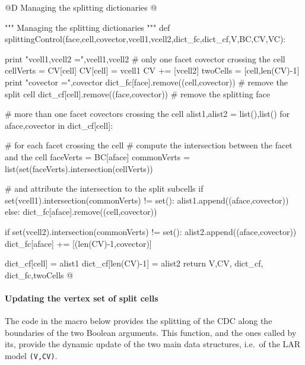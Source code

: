 \documentclass[11pt,oneside]{article}	%
\begin{document}
@D Managing the splitting dictionaries
@{""" Managing the splitting dictionaries """
def splittingControl(face,cell,covector,vcell1,vcell2,dict_fc,dict_cf,V,BC,CV,VC):

   print "vcell1,vcell2 =",vcell1,vcell2
   # only one facet covector crossing the cell
   cellVerts = CV[cell]
   CV[cell] = vcell1
   CV += [vcell2]
   twoCells = [cell,len(CV)-1]
   print "covector =",covector
   dict_fc[face].remove((cell,covector))   # remove the split cell
   dict_cf[cell].remove((face,covector))   # remove the splitting face
         
   # more than one facet covectors crossing the cell
   alist1,alist2 = list(),list()
   for aface,covector in dict_cf[cell]:
   
      # for each facet crossing the cell
      # compute the intersection between the facet and the cell
      faceVerts = BC[aface]
      commonVerts = list(set(faceVerts).intersection(cellVerts))
      
      # and attribute the intersection to the split subcells
      if set(vcell1).intersection(commonVerts) != set():
         alist1.append((aface,covector))
      else: dict_fc[aface].remove((cell,covector)) 
            
      if set(vcell2).intersection(commonVerts) != set():
         alist2.append((aface,covector))
         dict_fc[aface] += [(len(CV)-1,covector)]
   
   dict_cf[cell] = alist1  
   dict_cf[len(CV)-1] = alist2
   return V,CV, dict_cf, dict_fc,twoCells
@}


\paragraph{Updating the vertex set of split cells}
The code in the macro below provides the splitting of the CDC along the boundaries of the two Boolean arguments.
This function, and the ones called by its, provide the dynamic update of the two main data structures, i.e.~of the LAR model \texttt{(V,CV)}.
\end{document}
